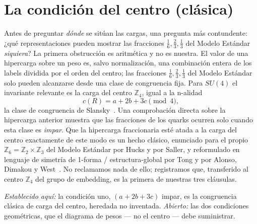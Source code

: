 \documentclass[11pt,a4paper]{article}
\newcommand{\ZZ}{\mathbb{Z}}
\begin{document}
\section{La condición del centro (clásica)}\label{sec:centre}
Antes de preguntar \emph{dónde} se sitúan las cargas, una pregunta más contundente: ¿qué
representaciones pueden mostrar las fracciones $\tfrac16,\tfrac23,\tfrac13$ del Modelo Estándar
\emph{siquiera}? La primera obstrucción es aritmética y no es nuestra. El valor de una
hipercarga sobre un peso es, salvo normalización, una combinación entera de los labels dividida
por el orden del centro; las fracciones $\tfrac16,\tfrac23,\tfrac13$ del Modelo Estándar solo
pueden alcanzarse desde una clase de congruencia fija. Para $SU(4)$ el invariante relevante es
la carga del centro $\ZZ_4$, igual a la n-alidad
\begin{equation}
c(R)=a+2b+3c \pmod 4,
\end{equation}
la clase de congruencia de Slansky~\cite{Slansky}. Una comprobación directa sobre la hipercarga
anterior muestra que las fracciones de los quarks ocurren solo cuando esta clase es
\emph{impar}. Que la hipercarga fraccionaria esté atada a la carga del centro exactamente de
este modo es un hecho clásico, enunciado para el propio $\ZZ_6=\ZZ_2\times\ZZ_3$ del Modelo
Estándar por Hucks y por Saller, y reformulado en lenguaje de simetría de 1-forma /
estructura-global por Tong y por Alonso, Dimakou y West~\cite{Hucks,Saller,Tong,Alonso}. No
reclamamos nada de ello; registramos que, transferido al centro $\ZZ_4$ del grupo de embedding,
es la primera de nuestras tres cláusulas.

\emph{Establecido aquí:} la condición uno, $(a+2b+3c)$ impar, es la congruencia clásica de
carga del centro, heredada no inventada. \emph{Abierto:} las dos condiciones geométricas, que
el diagrama de pesos --- no el centro --- debe suministrar.

\end{document}
